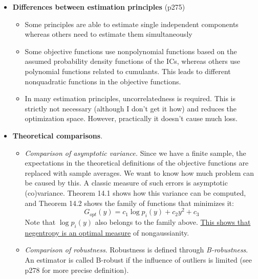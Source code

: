 \documentclass[a4paper, one	side]{book}
\begin{document}
\begin{itemize}
\item \textbf{Differences between estimation principles} (p275)
	\begin{itemize}
	\item Some principles are able to estimate single independent components whereas others need to estimate them simultaneously
	\item Some objective functions use nonpolynomial functions based on the assumed probability density functions of the ICs, whereas others use polynomial functions related to cumulants. This leads to different nonquadratic functions in the objective functions. 
	\item In many estimation principles, uncorrelatedness is required. This is strictly not necessary (although I don't get it how) and reduces the optimization space.  However, practically it doesn't cause much loss. 
	\end{itemize}
\item \textbf{Theoretical comparisons}.
	\begin{itemize}
	\item \textit{Comparison of asymptotic variance.} Since we have a finite sample, the expectations in the theoretical definitions of the objective functions are replaced with sample averages. We want to know how much problem can be caused by this. A classic measure of such errors is asymptotic (co)variance. Theorem 14.1 shows how this variance can be computed, and Theorem 14.2 shows the family of functions that minimizes it:%
	$$ G_{opt}(y) = c_1 \log p_i(y) + c_2 y^2 + c_3 $$
	Note that $\log p_i(y)$ also belongs to the family above. \underline{This shows that negentropy is an optimal measure}  of nongaussianity.
	\item \textit{Comparison of robustness}. Robustness is defined through \textit{B-robustness}. An estimator is called B-robust if the influence of outliers is limited (see p278 for more precise definition). 
	\end{itemize}
\end{itemize}
\end{document}
